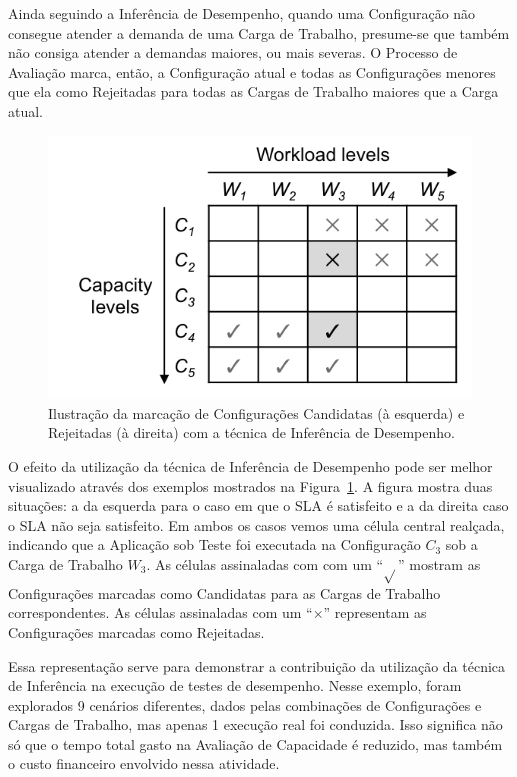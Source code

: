 \documentclass[12pt]{article}
\begin{document}
Ainda seguindo a Inferência de Desempenho, quando uma Configuração não consegue
atender a demanda de uma Carga de Trabalho, presume-se que também não consiga
atender a demandas maiores, ou mais severas. O Processo de Avaliação marca, então,
a Configuração atual e todas as Configurações menores que ela como Rejeitadas para todas as Cargas de Trabalho maiores que a Carga atual. 

\begin{figure}[t]
  \begin{center}
    \includegraphics[scale=.8]{img/inference}
  \end{center}
  \caption{\label{fig:fig_processo_inferencia}Ilustração da marcação de Configurações Candidatas (à esquerda) e Rejeitadas (à direita) com a técnica de Inferência de Desempenho.}
\end{figure}

O efeito da utilização da técnica de Inferência de Desempenho pode ser melhor
visualizado através dos exemplos mostrados na Figura~\ref{fig:fig_processo_inferencia}. A figura mostra 
duas situações: a da esquerda para o caso em que o SLA é satisfeito e a da direita 
caso o SLA não seja satisfeito. Em ambos os casos vemos uma célula central realçada, 
indicando que a Aplicação sob Teste foi executada na Configuração $C_3$ sob a 
Carga de Trabalho $W_3$. As células assinaladas com com um ``\boldmath$\surd{}$'' mostram as Configurações
marcadas como Candidatas para as Cargas de Trabalho correspondentes. As células
assinaladas com um ``\boldmath$\times{}$'' representam as Configurações marcadas como Rejeitadas.

Essa representação serve para demonstrar a contribuição da utilização da técnica 
de Inferência na execução de testes de desempenho. Nesse exemplo, foram 
explorados 9 cenários diferentes, dados pelas combinações de Configurações e 
Cargas de Trabalho, mas apenas 1 execução real foi conduzida. Isso significa não
só que o tempo total gasto na Avaliação de Capacidade é reduzido, mas também o
custo financeiro envolvido nessa atividade. 
\end{document}
